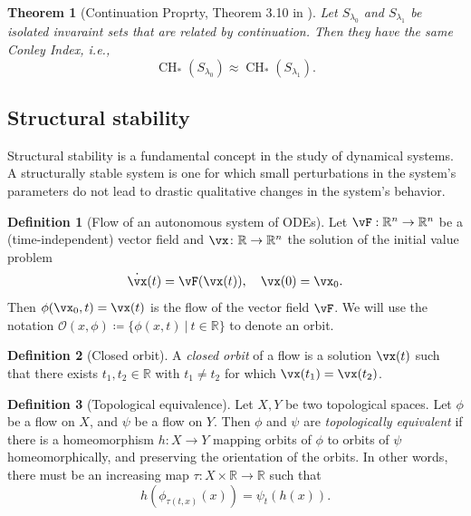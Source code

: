 \documentclass{article}
\newtheorem{theorem}{Theorem}
\theoremstyle{definition} \newtheorem{definition}{Definition}
\theoremstyle{remark} \newtheorem{remark}{Remark}
\newcommand{\reals}{\mathbb{R}}
\newcounter{ct}
\begin{document}
\begin{theorem}[Continuation Proprty, Theorem 3.10 in \citep{mischaikow1999cit}]
Let $S_{\lambda_0}$ and $S_{\lambda_1}$ be isolated invaraint sets that are related by continuation. 
Then they have the same Conley Index, i.e.,
\[
\operatorname{CH}_*(S_{\lambda_0})\approx \operatorname{CH}_*(S_{\lambda_1}).
\]
\end{theorem}


\subsection{Structural stability}\label{sec:ss}
\citep{peixoto1959ss, mane1987ss, hu1994ss, hayashi1997invariant, robbin1971ss, robinson1974ss, palis1970ss}

Structural stability is a fundamental concept in the study of dynamical systems. A structurally stable system is one for which small perturbations in the system's parameters do not lead to drastic qualitative changes in the system's behavior.

\begin{definition}[Flow of an autonomous system of ODEs]
Let $\vF: \reals^n\rightarrow \reals^n$ be a (time-independent) vector field and $\vx\colon\reals\rightarrow\reals^n$  the solution of the initial value problem
\[
\dot\vx(t) =  \vF(\vx(t)), \ \ \ \vx(0) = \vx_0.
\]
Then $ \phi (\vx_{0},t)=\vx(t)$ is the flow of the vector field $\vF$.
We will use the notation $\mathcal {O}(x,\phi)\coloneqq \{\phi(x,t)\ |\ t\in\reals\}$ to denote an orbit.
\end{definition}


\begin{definition}[Closed orbit]
A \emph{closed orbit} of a flow is a solution $\vx(t)$ such that there exists $t_1, t_2\in\reals$ with  $t_1\neq t_2$ for which $\vx(t_1) = \vx(t_2)$.
\end{definition}

\begin{definition}[Topological equivalence]
Let $X,Y$ be two topological spaces. Let $\phi$ be a flow on $X$, and $\psi$ be a flow on $Y$.
Then $\phi$ and $\psi$ are \emph{topologically equivalent} if there is a homeomorphism $h\colon X\to Y$ mapping orbits of  $\phi$  to orbits of $\psi$  homeomorphically, and preserving the orientation of the orbits. In other words, there must be  an increasing map $\tau\colon X\times\reals\rightarrow\reals$ such that 
\begin{equation}\label{eq:topeq}
h(\phi_{\tau(t,x)}(x)) = \psi_t(h(x)).
\end{equation}
\end{definition}
\end{document}
